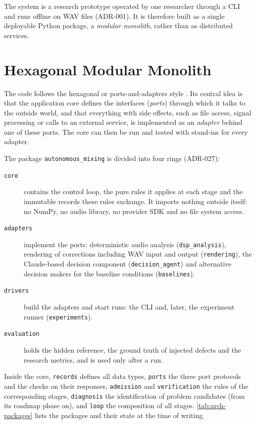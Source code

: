 The system is a research prototype operated by one researcher through a \ac{CLI} and runs offline on \ac{WAV} files (ADR-001). It is therefore built as a single deployable Python package, a \emph{modular monolith}, rather than as distributed services.

\section{Hexagonal Modular Monolith}
\label{sec:arch-hexagonal}

The code follows the hexagonal or ports-and-adapters style \cite{Cockburn2005}. Its central idea is that the application core defines the interfaces (\emph{ports}) through which it talks to the outside world, and that everything with side effects, such as file access, signal processing or calls to an external service, is implemented as an \emph{adapter} behind one of these ports. The core can then be run and tested with stand-ins for every adapter.

The package \texttt{autonomous\_mixing} is divided into four rings (ADR-027):

\begin{description}
	\item[\texttt{core}] contains the control loop, the pure rules it applies at each stage and the immutable records these rules exchange. It imports nothing outside itself: no NumPy, no audio library, no provider SDK and no file system access.
	\item[\texttt{adapters}] implement the ports: deterministic audio analysis (\texttt{dsp\_analysis}), rendering of corrections including \ac{WAV} input and output (\texttt{rendering}), the Claude-based decision component (\texttt{decision\_agent}) and alternative decision makers for the baseline conditions (\texttt{baselines}).
	\item[\texttt{drivers}] build the adapters and start runs: the \ac{CLI} and, later, the experiment runner (\texttt{experiments}).
	\item[\texttt{evaluation}] holds the hidden reference, the ground truth of injected defects and the research metrics, and is used only after a run.
\end{description}

Inside the core, \texttt{records} defines all data types, \texttt{ports} the three port protocols and the checks on their responses, \texttt{admission} and \texttt{verification} the rules of the corresponding stages, \texttt{diagnosis} the identification of problem candidates (from its roadmap phase on), and \texttt{loop} the composition of all stages. \autoref{tab:arch-packages} lists the packages and their state at the time of writing.

